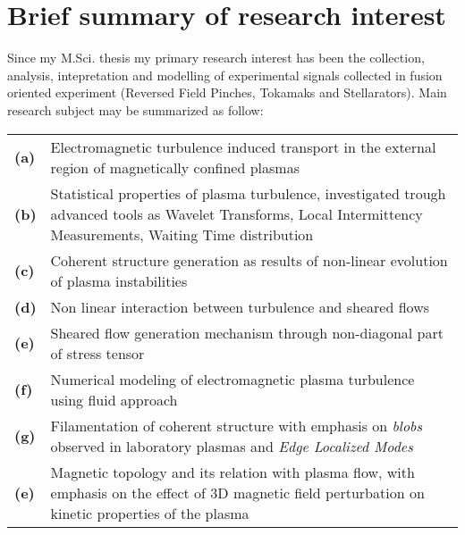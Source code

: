 \section{Brief summary of research interest}
Since my M.Sci. thesis my primary research interest has been the
collection, analysis, intepretation and modelling of experimental signals
collected in fusion oriented experiment (Reversed Field Pinches,
Tokamaks and Stellarators). Main research subject may be summarized as follow: 

\begin{longtable}{>{\bfseries}l p{17cm}}
(a) & Electromagnetic turbulence induced transport in the
  external region of magnetically confined plasmas \\
(b) & Statistical properties of plasma turbulence, investigated
  trough advanced tools as Wavelet Transforms, Local Intermittency
  Measurements, Waiting Time distribution \\
(c) & Coherent structure generation as results of non-linear
  evolution of plasma instabilities \\
(d) & Non linear interaction between turbulence and sheared flows \\
(e) & Sheared flow generation mechanism through non-diagonal part
  of stress tensor \\
(f) & Numerical modeling of electromagnetic plasma turbulence
  using fluid approach \\
(g) & Filamentation of coherent structure with emphasis on
  \emph{blobs} observed in laboratory plasmas and \emph{Edge Localized
  Modes} \\
(e) & Magnetic topology and its relation with plasma flow, with
emphasis on the effect of 3D magnetic field perturbation on kinetic
properties of the plasma \\
\end{longtable}

